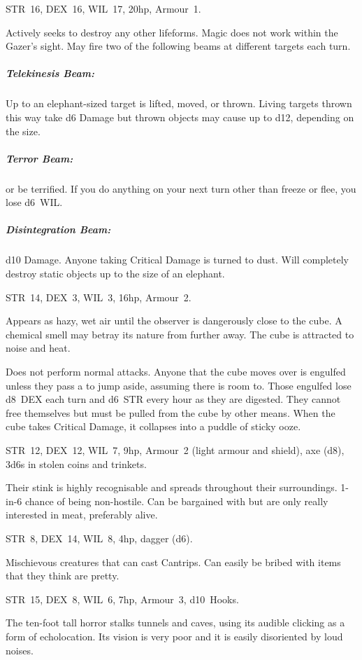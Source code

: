 \documentclass[itdr]{subfiles}
\begin{document}
\break

STR~16, DEX~16, WIL~17, 20hp, Armour~1.

Actively seeks to destroy any other lifeforms. Magic does not work within the Gazer's sight. May fire two of the following beams at different targets
each turn.

\subparagraph{Telekinesis Beam:} Up to an elephant-sized target is lifted, moved, or thrown. Living targets thrown this way take d6 Damage but thrown objects may cause up to d12, depending on the size.

\subparagraph{Terror Beam:}  or be terrified. If you do anything on your next turn other than freeze or flee, you lose d6~WIL.

\subparagraph{Disintegration Beam:} d10 Damage. Anyone taking Critical Damage is turned to dust. Will completely destroy static objects up to the size of an elephant.


STR~14, DEX~3, WIL~3, 16hp, Armour~2.

Appears as hazy, wet air until the observer is dangerously close to the cube. A chemical smell may betray its nature from further away. The cube is
attracted to noise and heat.

Does not perform normal attacks. Anyone that the cube moves over is engulfed unless they pass a  to jump aside, assuming there is room to. Those engulfed lose d8~DEX each turn and d6~STR every hour as they are digested. They cannot free themselves but must be pulled from the cube by other means. When the cube takes Critical Damage, it collapses into a puddle of sticky ooze.



STR~12, DEX~12, WIL~7, 9hp, Armour~2 (light armour and shield), axe (d8), 3d6s in stolen coins and trinkets.

Their stink is highly recognisable and spreads throughout their surroundings.
1-in-6 chance of being non-hostile. Can be bargained with but are only really interested in meat, preferably alive.


STR~8, DEX~14, WIL~8, 4hp, dagger (d6).

Mischievous creatures that can cast Cantrips. Can easily be bribed with items that they think are pretty.


STR~15, DEX~8, WIL~6, 7hp, Armour~3, d10~Hooks.

The ten-foot tall horror stalks tunnels and caves, using its audible clicking as a form of echolocation. Its vision is very poor and it is easily disoriented by loud noises.
\end{document}
